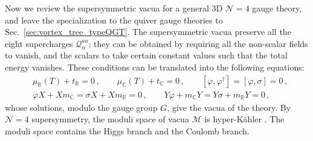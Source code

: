 \documentclass[12pt,a4paper]{article}
\renewcommand{\(}{\left(}
\renewcommand{\)}{\right)}
\renewcommand{\(}{\left(}
\renewcommand{\)}{\right)}
\begin{document}
Now we review the supersymmetric vacua for a general 3D $\mathcal{N}=4$ gauge theory, and leave the specialization to the quiver gauge theories to Sec.~\ref{sec:vortex_tree_typeQGT}.
The supersymmetric vacua preserve all the eight supercharges $\mathcal{Q}^{a\dot{a}}_{\alpha}$; they can be obtained by requiring all the non-scalar fields to vanish, and the scalars to take certain constant values such that the total energy vanishes. 
These conditions can be translated into the following equations:
\begin{equation}\label{eq:SUSY-vacua}
\begin{aligned}
&\mu_{\mathbb{R}}(T)+t_{\mathbb{R}}=0\,, \qquad \mu_{\mathbb{C}}(T)+t_{\mathbb{C}}=0\,,\qquad [\varphi,\varphi^\dag]=[\varphi,\sigma]=0\,,\\
&\varphi X+X m_{\mathbb{C}}=\sigma X+X m_{\mathbb{R}} =0\,, \qquad Y\varphi+m_{\mathbb{C}}Y=Y\sigma+m_{\mathbb{R}}Y =0\,,
\end{aligned}    
\end{equation}
whose solutions, modulo the gauge group $G$, give the vacua of the theory. 
By $\mathcal{N}=4$ supersymmetry, the moduli space of vacua $\mathcal{M}$ is hyper-K\"{a}hler \cite{Alvarez-Gaume:1981exv,Crew:2021ipc}.
The moduli space contains the Higgs branch and the Coulomb branch. 
\end{document}
